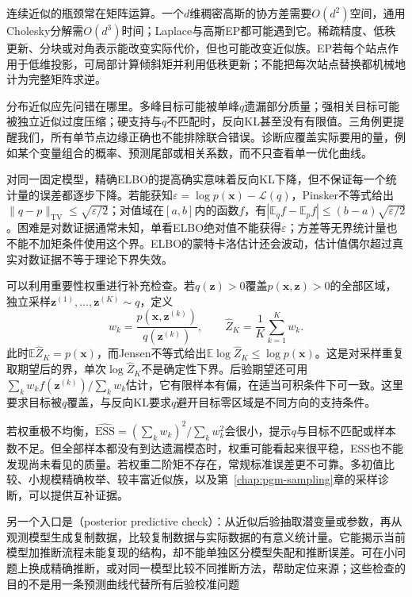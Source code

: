 连续近似的瓶颈常在矩阵运算。一个$d$维稠密高斯的协方差需要$O(d^2)$空间，通用Cholesky分解需$O(d^3)$时间；Laplace与高斯EP都可能遇到它。稀疏精度、低秩更新、分块或对角表示能改变实际代价，但也可能改变近似族。EP若每个站点作用于低维投影，可局部计算倾斜矩并利用低秩更新；不能把每次站点替换都机械地计为完整矩阵求逆。

分布近似应先问错在哪里。多峰目标可能被单峰$q$遗漏部分质量；强相关目标可能被独立近似过度压缩；硬支持与$q$不匹配时，反向KL甚至没有有限值。三角例更提醒我们，所有单节点边缘正确也不能排除联合错误。诊断应覆盖实际要用的量，例如某个变量组合的概率、预测尾部或相关系数，而不只查看单一优化曲线。

对同一固定模型，精确ELBO的提高确实意味着反向KL下降，但不保证每一个统计量的误差都逐步下降。若能获知$\varepsilon=\log p(\bm x)-\mathcal L(q)$，Pinsker不等式给出$\|q-p\|_{\mathrm{TV}}\leq\sqrt{\varepsilon/2}$；对值域在$[a,b]$内的函数$f$，有$|\mathbb E_qf-\mathbb E_pf|\leq(b-a)\sqrt{\varepsilon/2}$。困难是对数证据通常未知，单看ELBO绝对值不能获得$\varepsilon$；方差等无界统计量也不能不加矩条件使用这个界。ELBO的蒙特卡洛估计还会波动，估计值偶尔超过真实对数证据不等于理论下界失效。

可以利用重要性权重进行补充检查。若$q(\bm z)>0$覆盖$p(\bm x,\bm z)>0$的全部区域，独立采样$\bm z^{(1)},\ldots,\bm z^{(K)}\sim q$，定义
\begin{equation}
  w_k=\frac{p(\bm x,\bm z^{(k)})}{q(\bm z^{(k)})},
  \qquad
  \widehat Z_K=\frac1K\sum_{k=1}^K w_k.
  \label{eq:pgm-variational-importance}
\end{equation}
此时$\mathbb E\widehat Z_K=p(\bm x)$，而Jensen不等式给出$\mathbb E\log\widehat Z_K\leq\log p(\bm x)$。这是对采样重复取期望后的界，单次$\log\widehat Z_K$不是确定性下界。后验期望还可用$\sum_kw_kf(\bm z^{(k)})/\sum_kw_k$估计，它有限样本有偏，在适当可积条件下可一致。这里要求目标被$q$覆盖，与反向KL要求$q$避开目标零区域是不同方向的支持条件。

若权重极不均衡，$\widehat{\mathrm{ESS}}=(\sum_kw_k)^2/\sum_kw_k^2$会很小，提示$q$与目标不匹配或样本数不足。但全部样本都没有到达遗漏模态时，权重可能看起来很平稳，ESS也不能发现尚未看见的质量。若权重二阶矩不存在，常规标准误差更不可靠。多初值比较、小规模精确枚举、较丰富近似族，以及第~\ref{chap:pgm-sampling}章的采样诊断，可以提供互补证据。

另一个入口是（posterior predictive check）：从近似后验抽取潜变量或参数，再从观测模型生成复制数据，比较复制数据与实际数据的有意义统计量。它能揭示当前模型加推断流程未能复现的结构，却不能单独区分模型失配和推断误差。可在小问题上换成精确推断，或对同一模型比较不同推断方法，帮助定位来源；这些检查的目的不是用一条预测曲线代替所有后验校准问题

